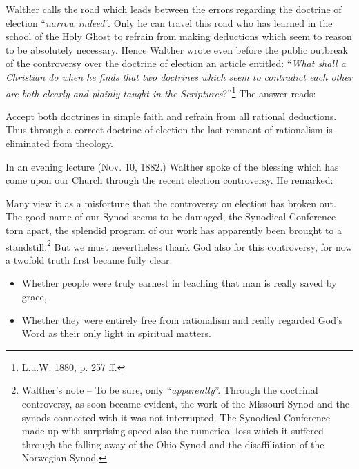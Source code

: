                 Walther calls the road which leads between the errors regarding the doctrine of election “\textit{narrow indeed}”.  Only he can travel this road who has learned in the school of the Holy Ghost to refrain from making deductions which seem to reason to be absolutely necessary.  Hence Walther wrote even before the public outbreak of the controversy over the doctrine of election an article entitled: “\textit{What shall a Christian do when he finds that two doctrines which seem to contradict each other are both clearly and plainly taught in the Scriptures}?”\footnote{L.u.W. 1880, p. 257 ff.}  The answer reads: \begin{displayquote}{\footnotesize Accept both doctrines in simple faith and refrain from all rational deductions.  Thus through a correct doctrine of election the last remnant of rationalism is eliminated from theology.}\end{displayquote}  In an evening lecture {\scriptsize\textsc{(Nov. 10, 1882.)}} Walther spoke of the blessing which has come upon our Church through the recent election controversy.  He remarked: \begin{fancyquotes}Many view it as a misfortune that the controversy on election has broken out.  The good name of our Synod seems to be damaged, the Synodical Conference torn apart, the splendid program of our work has apparently been brought to a standstill.\footnote{Walther's note -- To be sure, only “\textit{apparently}”.  Through the doctrinal controversy, as soon became evident, the work of the Missouri Synod and the synods connected with it was not interrupted.  The Synodical Conference made up with surprising speed also the numerical loss which it suffered through the falling away of the Ohio Synod and the disaffiliation of the Norwegian Synod.}  But we must nevertheless thank God also for this controversy, for now a twofold truth first became fully clear: \begin{itemize}\item Whether people were truly earnest in teaching that man is really saved by grace, \item Whether they were entirely free from rationalism and really regarded God’s Word as their only light in spiritual matters.\end{itemize}\end{fancyquotes}

